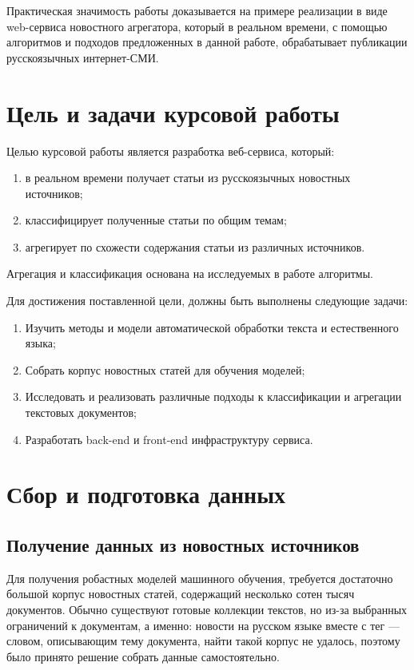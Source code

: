 \documentclass[a4paper, 14pt]{extarticle}
\begin{document}
Практическая значимость работы доказывается на примере реализации в виде web-сервиса новостного агрегатора,
который в реальном времени, с помощью алгоритмов и подходов предложенных в данной работе,
обрабатывает публикации русскоязычных интернет-СМИ.

\section{Цель и задачи курсовой работы}
Целью курсовой работы является разработка веб-сервиса, который:
\begin{enumerate}
	\item в реальном времени получает статьи из русскоязычных новостных источников;
	\item классифицирует полученные статьи по общим темам;
	\item агрегирует по схожести содержания статьи из различных источников.
\end{enumerate}
Агрегация и классификация основана на исследуемых в работе алгоритмы.

Для достижения поставленной цели, должны быть выполнены следующие задачи:
\begin{enumerate}
	\item Изучить методы и модели автоматической обработки текста и естественного языка;
	\item Собрать корпус новостных статей для обучения моделей;
	\item Исследовать и реализовать различные подходы к классификации и агрегации текстовых документов;
	\item Разработать back-end и front-end инфраструктуру сервиса.
\end{enumerate}

\section{Сбор и подготовка данных}
\subsection{Получение данных из новостных источников}
Для получения робастных моделей машинного обучения, требуется достаточно большой корпус новостных статей,
содержащий несколько сотен тысяч документов. Обычно существуют готовые коллекции текстов, но из-за выбранных 
ограничений к документам, а именно: новости на русском языке вместе с тег --- словом, описывающим тему 
документа, найти такой корпус не удалось, поэтому было принято решение собрать данные самостоятельно.
\end{document}

